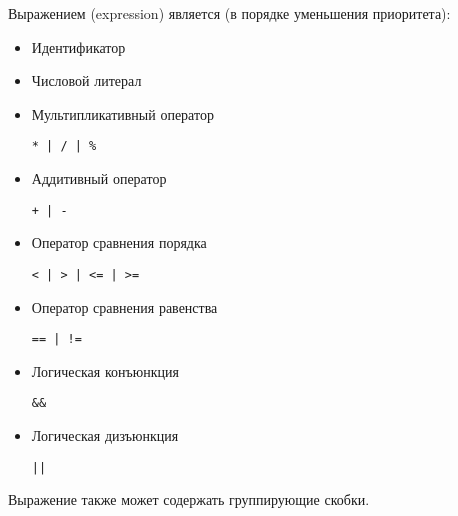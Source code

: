 Выражением (expression) является (в порядке уменьшения приоритета):
\begin{itemize}
    \item Идентификатор\\
    
    \item Числовой литерал\\
    
    \item Мультипликативный оператор
\begin{lstlisting}
* | / | %
\end{lstlisting}
    
    \item Аддитивный оператор
\begin{lstlisting}
+ | -
\end{lstlisting}
    
    \item Оператор сравнения порядка
\begin{lstlisting}
< | > | <= | >=
\end{lstlisting}
    
    \item Оператор сравнения равенства
\begin{lstlisting}
== | !=
\end{lstlisting}
    
    \item Логическая конъюнкция
\begin{lstlisting}
&&
\end{lstlisting}
    
    \item Логическая дизъюнкция
\begin{lstlisting}
||
\end{lstlisting}
\end{itemize}

Выражение также может содержать группирующие скобки.


